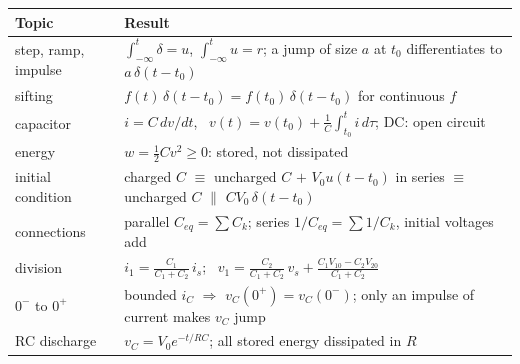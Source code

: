 \documentclass[11pt,a4paper]{article}
\newcommand{\Vo}{V_0}
\begin{document}
\begin{center}
\small
\renewcommand{\arraystretch}{1.35}
\begin{tabular}{@{}>{\raggedright}p{3.6cm} >{\raggedright\arraybackslash}p{10.3cm}@{}}
\toprule
\textbf{Topic} & \textbf{Result}\\
\midrule
step, ramp, impulse & $\int_{-\infty}^t \delta = u$, $\int_{-\infty}^t u = r$; a jump of size $a$ at $t_0$ differentiates to $a\,\delta(t - t_0)$\\
sifting & $f(t)\,\delta(t - t_0) = f(t_0)\,\delta(t - t_0)$ for continuous $f$\\
capacitor & $i = C\,dv/dt$, \ $v(t) = v(t_0) + \frac1C\int_{t_0}^t i\,d\tau$; DC: open circuit\\
energy & $w = \frac12 C v^2 \geq 0$: stored, not dissipated\\
initial condition & charged $C$ $\equiv$ uncharged $C$ $+$ $\Vo u(t - t_0)$ in series $\equiv$ uncharged $C$ $\parallel$ $C\Vo\,\delta(t - t_0)$\\
connections & parallel $C_{eq} = \sum C_k$; series $1/C_{eq} = \sum 1/C_k$, initial voltages add\\
division & $i_1 = \frac{C_1}{C_1 + C_2}\,i_s$; \ $v_1 = \frac{C_2}{C_1 + C_2}\,v_s + \frac{C_1 V_{10} - C_2 V_{20}}{C_1 + C_2}$\\
$0^-$ to $0^+$ & bounded $i_C$ $\Rightarrow$ $v_C(0^+) = v_C(0^-)$; only an impulse of current makes $v_C$ jump\\
RC discharge & $v_C = \Vo e^{-t/RC}$; all stored energy dissipated in $R$\\
\bottomrule
\end{tabular}
\end{center}
\end{document}
